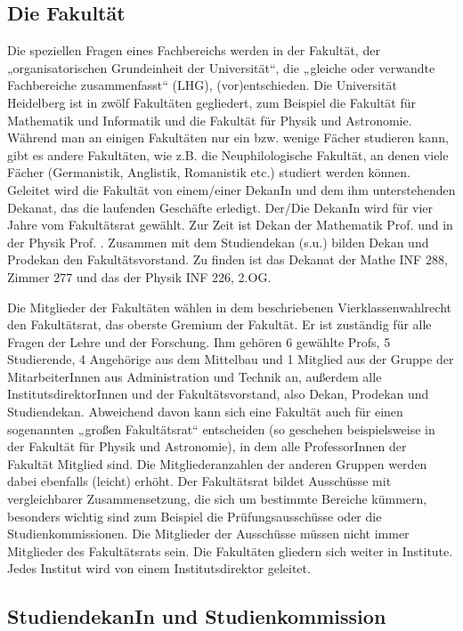 \subsection{Die Fakultät}

Die speziellen Fragen eines Fachbereichs werden in der Fakultät, der
„organisatorischen Grundeinheit der Universität“, die „gleiche oder
verwandte Fachbereiche zusammenfasst“ (LHG), (vor)entschieden. Die
Universität Heidelberg ist in zwölf Fakultäten gegliedert, zum Beispiel 
die Fakultät für Mathematik und Informatik und die Fakultät für Physik und 
Astronomie. Während man an einigen Fakultäten nur ein bzw. wenige Fächer studieren
kann, gibt es andere Fakultäten, wie z.B. die Neuphilologische Fakultät,
an denen viele Fächer (Germanistik, Anglistik, Romanistik etc.) studiert
werden können. Geleitet wird die Fakultät von einem/einer DekanIn und dem
ihm unterstehenden Dekanat, das die laufenden Geschäfte erledigt. Der/Die
DekanIn wird für vier Jahre vom Fakultätsrat gewählt. Zur Zeit ist Dekan der
Mathematik Prof. \dekanmathe{} und in der Physik Prof. \dekanphysik. Zusammen mit dem
Studiendekan (s.u.) bilden Dekan und Prodekan den Fakultätsvorstand. Zu
finden ist das Dekanat der Mathe \gls{INF} 288, Zimmer 277 und das der Physik
INF 226, 2.OG.

Die Mitglieder der Fakultäten wählen in dem beschriebenen
Vierklassenwahlrecht den Fakultätsrat, das oberste Gremium der Fakultät.
Er ist zuständig für alle Fragen der Lehre und der Forschung. Ihm gehören
6 gewählte Profs, 5 Studierende, 4 Angehörige aus dem Mittelbau und 1 Mitglied
aus der Gruppe der MitarbeiterInnen aus Administration und Technik
an, außerdem alle InstitutsdirektorInnen und der Fakultätsvorstand, also Dekan,
Prodekan und Studiendekan. Abweichend davon kann sich eine Fakultät auch für einen
sogenannten „großen Fakultätsrat“ entscheiden (so geschehen beispielsweise in der 
Fakultät für Physik und Astronomie), in dem alle ProfessorInnen der Fakultät 
Mitglied sind. Die Mitgliederanzahlen der anderen Gruppen werden dabei ebenfalls
(leicht) erhöht. Der Fakultätsrat bildet Ausschüsse mit vergleichbarer
Zusammensetzung, die sich um bestimmte Bereiche kümmern, besonders wichtig
sind zum Beispiel die Prüfungsausschüsse oder die Studienkommissionen. Die
Mitglieder der Ausschüsse müssen nicht immer Mitglieder des Fakultätsrats
sein. Die Fakultäten gliedern sich weiter in Institute. Jedes Institut
wird von einem Institutsdirektor geleitet.

\subsection{StudiendekanIn und Studienkommission}

